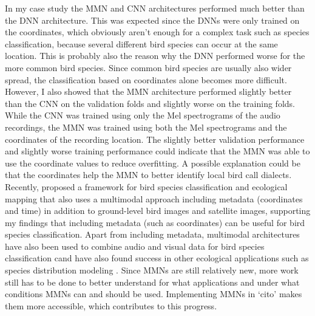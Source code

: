 \documentclass[12pt,twoside]{scrreport}
\newcommand{\pkg}[1]{`#1'}
\begin{document}
In my case study the MMN and CNN architectures performed much better than the DNN architecture. This was expected since the DNNs were only trained on the coordinates, which obviously aren't enough for a complex task such as species classification, because several different bird species can occur at the same location. This is probably also the reason why the DNN performed worse for the more common bird species. Since common bird species are usually also wider spread, the classification based on coordinates alone becomes more difficult. However, I also showed that the MMN architecture performed slightly better than the CNN on the validation folds and slightly worse on the training folds. While the CNN was trained using only the Mel spectrograms of the audio recordings, the MMN was trained using both the Mel spectrograms and the coordinates of the recording location. The slightly better validation performance and slightly worse training performance could indicate that the MMN was able to use the coordinate values to reduce overfitting. A possible explanation could be that the coordinates help the MMN to better identify local bird call dialects. Recently, \citet{sastryBirdSATCrossViewContrastive2024} proposed a framework for bird species classification and ecological mapping that also uses a multimodal approach including metadata (coordinates and time) in addition to ground-level bird images and satellite images, supporting my findings that including metadata (such as coordinates) can be useful for bird species classification. Apart from including metadata, multimodal architectures have also been used to combine audio and visual data for bird species classification \citep[e.g.,][]{bold2019cross}cand have also found success in other ecological applications such as species distribution modeling \citep[e.g.,][]{zhangNovelMultimodalSpecies2022}. Since MMNs are still relatively new, more work  still has to be done to better understand for what applications and under what conditions MMNs can and should be used. Implementing MMNs in \pkg{cito} makes them more accessible, which contributes to this progress.
\end{document}
